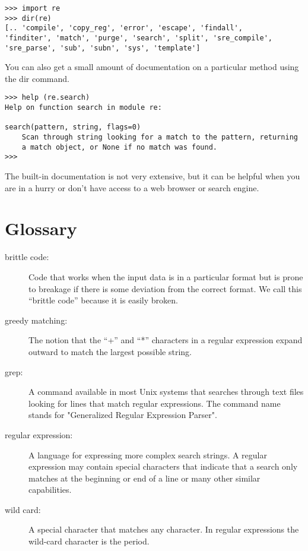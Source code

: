 \beforeverb
\begin{verbatim}
>>> import re
>>> dir(re)
[.. 'compile', 'copy_reg', 'error', 'escape', 'findall', 
'finditer', 'match', 'purge', 'search', 'split', 'sre_compile', 
'sre_parse', 'sub', 'subn', 'sys', 'template']
\end{verbatim}
\afterverb
%
You can also get a small amount of documentation on a particular method using the dir command.

\beforeverb
\begin{verbatim}
>>> help (re.search)
Help on function search in module re:

search(pattern, string, flags=0)
    Scan through string looking for a match to the pattern, returning
    a match object, or None if no match was found.
>>> 
\end{verbatim}
\afterverb
%
The built-in documentation is not very extensive, but it can be helpful when you are in a hurry
or don't have access to a web browser or search engine.

\section{Glossary}

\begin{description}

\item[brittle code:]
Code that works when the input data is in a particular format but is prone to breakage
if there is some deviation from the correct format.  We call this ``brittle code'' 
because it is easily broken.

\item[greedy matching:]
The notion that the ``+'' and ``*'' characters in a regular expression expand outward to
match the largest possible string.

\item[grep:]
A command available in most Unix systems that searches through text files looking for lines
that match regular expressions. The command name stands for "Generalized Regular Expression Parser".

\item[regular expression:]
A language for expressing more complex search strings.  A regular expression may contain
special characters that indicate that a search only matches at the beginning or end of a line
or many other similar capabilities.

\item[wild card:]
A special character that matches any character.  In regular expressions the wild-card
character is the period.

\end{description}

